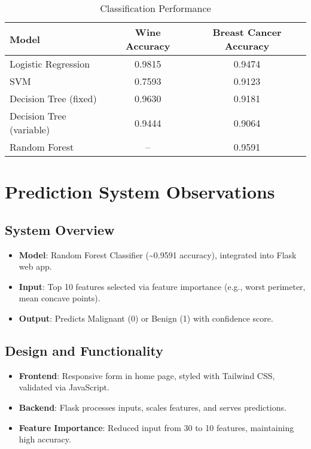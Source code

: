 \documentclass[a4paper,12pt]{article}
\begin{document}
\begin{table}[h]
    \centering
    \caption{Classification Performance}
    \begin{tabular}{lcc}
        \toprule
        \textbf{Model} & \textbf{Wine Accuracy} & \textbf{Breast Cancer Accuracy} \\
        \midrule
        Logistic Regression & 0.9815 & 0.9474 \\
        SVM & 0.7593 & 0.9123 \\
        Decision Tree (fixed) & 0.9630 & 0.9181 \\
        Decision Tree (variable) & 0.9444 & 0.9064 \\
        Random Forest & -- & 0.9591 \\
        \bottomrule
    \end{tabular}
\end{table}

\section{Prediction System Observations}
\subsection{System Overview}
\begin{itemize}[noitemsep]
    \item \textbf{Model}: Random Forest Classifier (\textasciitilde0.9591 accuracy), integrated into Flask web app.
    \item \textbf{Input}: Top 10 features selected via feature importance (e.g., worst perimeter, mean concave points).
    \item \textbf{Output}: Predicts Malignant (0) or Benign (1) with confidence score.
\end{itemize}

\subsection{Design and Functionality}
\begin{itemize}[noitemsep]
    \item \textbf{Frontend}: Responsive form in home page, styled with Tailwind CSS, validated via JavaScript.
    \item \textbf{Backend}: Flask processes inputs, scales features, and serves predictions.
    \item \textbf{Feature Importance}: Reduced input from 30 to 10 features, maintaining high accuracy.
\end{itemize}
\end{document}
